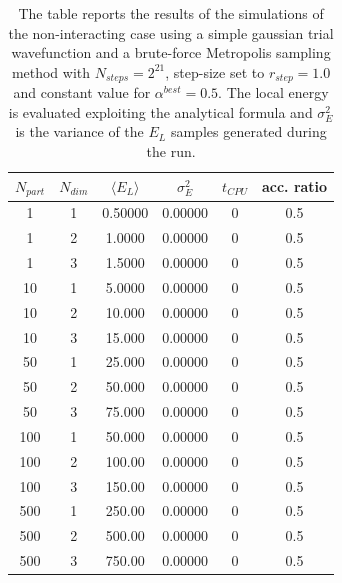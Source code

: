 \begin{table}[H]
    \centering
    \begin{tabular}{cccccc}
    $N_{part}$ & $N_{dim}$ & $\langle E_L \rangle$ & $\sigma^2_E$ & $t_{CPU}$ & acc. ratio \\
    \midrule
    1 & 1 & 0.50000 & 0.00000 & 0 & 0.5 \\
    1 & 2 & 1.0000 & 0.00000 & 0 & 0.5 \\
    1 & 3 & 1.5000 & 0.00000 & 0 & 0.5 \\
    \midrule
    10 & 1 & 5.0000 & 0.00000 & 0 & 0.5 \\
    10 & 2 & 10.000 & 0.00000 & 0 & 0.5 \\
    10 & 3 & 15.000 & 0.00000 & 0 & 0.5 \\
    \midrule
    50 & 1 & 25.000 & 0.00000 & 0 & 0.5 \\
    50 & 2 & 50.000 & 0.00000 & 0 & 0.5 \\
    50 & 3 & 75.000 & 0.00000 & 0 & 0.5 \\
    \midrule
    100 & 1 & 50.000 & 0.00000 & 0 & 0.5 \\
    100 & 2 & 100.00 & 0.00000 & 0 & 0.5 \\
    100 & 3 & 150.00 & 0.00000 & 0 & 0.5 \\
    \midrule
    500 & 1 & 250.00 & 0.00000 & 0 & 0.5 \\
    500 & 2 & 500.00 & 0.00000 & 0 & 0.5 \\
    500 & 3 & 750.00 & 0.00000 & 0 & 0.5 \\
    \bottomrule
    \end{tabular}
    \caption{The table reports the results of the simulations of the non-interacting case using a simple gaussian trial wavefunction and a brute-force Metropolis sampling method with $N_{steps}=2^{21}$, step-size set to $r_{step}=1.0$ and constant value for $\alpha^{best}=0.5$. The local energy is evaluated exploiting the analytical formula and $\sigma_E^2$ is the variance of the $E_L$ samples generated during the run. }
    \label{tab:tab_x_metropolis_analytical}
\end{table}

